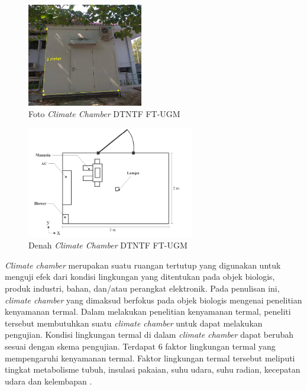 \begin{figure}[!h]
	\centering
	\centering
	\includegraphics[width=0.45\textwidth]{figures/climatechamber}
	\caption{Foto \textit{Climate Chamber} DTNTF FT-UGM}
	\label{fig:1:fotochamber}
\end{figure}

\vspace{1mm}

\begin{figure}[!h]
	\centering
	\centering
	\includegraphics[width=0.65\textwidth]{figures/DenahChamber}
	\caption{Denah \textit{Climate Chamber} DTNTF FT-UGM\cite{skripsiIchfan}}
	\label{fig:1:denahchamber}
\end{figure}

\vspace{3em}

\textit{Climate chamber} merupakan suatu ruangan tertutup yang digunakan untuk menguji efek dari kondisi lingkungan yang ditentukan pada objek biologis, produk industri, bahan, dan/atau perangkat elektronik. Pada penulisan ini, \textit{climate chamber} yang dimaksud berfokus pada objek biologis mengenai penelitian kenyamanan termal. Dalam melakukan penelitian kenyamanan termal, peneliti tersebut membutuhkan suatu \textit{climate chamber} untuk dapat melakukan pengujian. Kondisi lingkungan termal di dalam \textit{climate chamber} dapat berubah sesuai dengan skema pengujian. Terdapat 6 faktor lingkungan termal yang mempengaruhi kenyamanan termal. Faktor lingkungan termal tersebut meliputi tingkat metabolisme tubuh, insulasi pakaian, suhu udara, suhu radian, kecepatan udara dan kelembapan \cite{ASHRAE55}.

